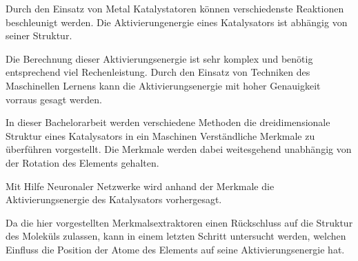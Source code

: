 
\Abstract

Durch den Einsatz von Metal Katalystatoren können verschiedenste Reaktionen beschleunigt werden.
Die Aktivierungenergie eines Katalysators ist abhängig von seiner Struktur. 

Die Berechnung dieser Aktivierungsenergie ist sehr komplex und benötig entsprechend viel Rechenleistung.
Durch den Einsatz von Techniken des Maschinellen Lernens kann die Aktivierungsenergie mit hoher Genauigkeit vorraus gesagt werden.

In dieser Bachelorarbeit werden verschiedene Methoden die dreidimensionale Struktur eines Katalysators in ein Maschinen Verständliche
Merkmale zu überführen vorgestellt.
Die Merkmale werden dabei weitesgehend unabhängig von der Rotation des Elements gehalten.

Mit Hilfe Neuronaler Netzwerke wird anhand der Merkmale die Aktivierungsenergie des Katalysators vorhergesagt.

Da die hier vorgestellten Merkmalsextraktoren einen Rückschluss auf die Struktur des Moleküls zulassen, kann in einem letzten Schritt untersucht werden,
welchen Einfluss die Position der Atome des Elements auf seine Aktivierungsenergie hat.


